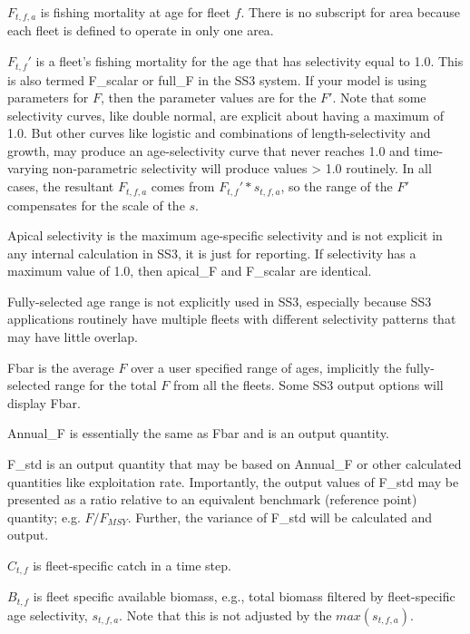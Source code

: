 $F_{t,f,a}$ is fishing mortality at age for fleet $f$. There is no subscript for area because each fleet is defined to operate in only one area.

$F_{t,f}'$ is a fleet's fishing mortality for the age that has selectivity equal to 1.0. This is also termed F\_scalar or full\_F in the SS3 system. If your model is using parameters for $F$, then the parameter values are for the $F'$. Note that some selectivity curves, like double normal, are explicit about having a maximum of 1.0. But other curves like logistic and combinations of length-selectivity and growth, may produce an age-selectivity curve that never reaches 1.0 and time-varying non-parametric selectivity will produce values > 1.0 routinely. In all cases, the resultant $F_{t,f,a}$ comes from $F_{t,f}' * s_{t,f,a}$, so the range of the $F'$ compensates for the scale of the $s$.

Apical selectivity is the maximum age-specific selectivity and is not explicit in any internal calculation in SS3, it is just for reporting. If selectivity has a maximum value of 1.0, then apical\_F and F\_scalar are identical.

Fully-selected age range is not explicitly used in SS3, especially because SS3 applications routinely have multiple fleets with different selectivity patterns that may have little overlap.

Fbar is the average $F$ over a user specified range of ages, implicitly the fully-selected range for the total $F$ from all the fleets. Some SS3 output options will display Fbar.

Annual\_F is essentially the same as Fbar and is an output quantity.

F\_std is an output quantity that may be based on Annual\_F or other calculated quantities like exploitation rate. Importantly, the output values of F\_std may be presented as a ratio relative to an equivalent benchmark (reference point) quantity; e.g. $F / F_{MSY}$. Further, the variance of F\_std will be calculated and output.

$C_{t,f}$ is fleet-specific catch in a time step.

$B_{t,f}$ is fleet specific available biomass, e.g., total biomass filtered by fleet-specific age selectivity, $s_{t,f,a}$. Note that this is not adjusted by the $max(s_{t,f,a})$.


